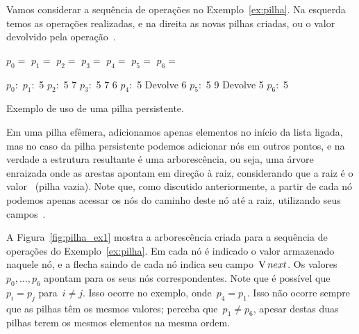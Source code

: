\documentclass[main.tex]{subfiles}
\begin{document}
Vamos considerar a sequência de operações no Exemplo~\ref{ex:pilha}. Na esquerda temos as operações realizadas, e na direita as novas pilhas criadas, ou o valor devolvido pela operação~.

\begin{example}
\centering

\begin{subalgorithm}{0.4\textwidth}
\begin{algorithmic}

\State $p_0 =$ 
\State $p_1 =$ 
\State $p_2 =$ 
\State $p_3 =$ 
\State $p_4 =$ 
\State {}
\State $p_5 =$ 
\State {}
\State $p_6 =$ 

\end{algorithmic}
\end{subalgorithm} \vrule
\begin{subalgorithm}{0.4\textwidth}
\begin{algorithmic}

\State $p_0:$
\State $p_1:$ 5
\State $p_2:$ 5 7
\State $p_3:$ 5 7 6
\State $p_4:$ 5
\State Devolve 6
\State $p_5:$ 5 9
\State Devolve 5
\State $p_6:$ 5

\end{algorithmic}
\end{subalgorithm}
\caption{Exemplo de uso de uma pilha persistente.} \label{ex:pilha}
\end{example}

Em uma pilha efêmera, adicionamos apenas elementos no início da lista ligada, mas no caso da pilha persistente podemos adicionar nós em outros pontos, e na verdade a estrutura resultante é uma arborescência, ou seja, uma árvore enraizada onde as arestas apontam em direção à raiz, considerando que a raiz é o valor~ (pilha vazia). Note que, como discutido anteriormente, a partir de cada nó podemos apenas acessar os nós do caminho deste nó até a raiz, utilizando seus campos~.

A Figura~\ref{fig:pilha_ex1} mostra a arborescência criada para a sequência de operações do Exemplo~\ref{ex:pilha}. Em cada nó é indicado o valor armazenado naquele nó, e a flecha saindo de cada nó indica seu campo~$\operatorname{V}{next}$. Os valores~$p_0, \ldots, p_6$ apontam para os seus nós correspondentes. Note que é possível que~${p_i = p_j}$ para~${i \neq j}$. Isso ocorre no exemplo, onde~$p_4 = p_1$. Isso não ocorre sempre que as pilhas têm os mesmos valores; perceba que~$p_1 \neq p_6$, apesar destas duas pilhas terem os mesmos elementos na mesma ordem.
\end{document}
